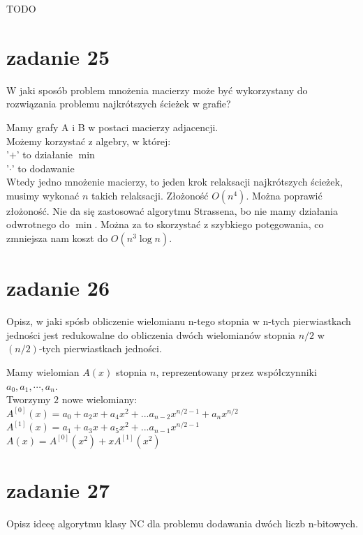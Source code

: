 \documentclass[svgnames]{report}
\begin{document}
TODO
\section{zadanie 25}
\begin{framed}
W jaki sposób problem mnożenia macierzy może być wykorzystany do rozwiązania problemu najkrótszych ścieżek w grafie?
\end{framed}

Mamy grafy A i B w postaci macierzy adjacencji.\\
Możemy korzystać z algebry, w której:\\
'$+$' to działanie $\min$\\
'$\cdot$' to dodawanie\\
Wtedy jedno mnożenie macierzy, to jeden krok relaksacji najkrótszych ścieżek, musimy wykonać $n$ takich relaksacji. Złożoność $O(n^4)$. Można poprawić złożoność. Nie da się zastosować algorytmu Strassena, bo nie mamy działania odwrotnego do $\min$. Można za to skorzystać z szybkiego potęgowania, co zmniejsza nam koszt do $O(n^3\log n)$.

\section{zadanie 26}
\begin{framed}
Opisz, w jaki spósb obliczenie wielomianu n-tego stopnia w n-tych pierwiastkach jedności jest redukowalne do obliczenia dwóch wielomianów stopnia $n/2$ w $(n/2)$-tych pierwiastkach jedności.
\end{framed}

Mamy wielomian $A(x)$ stopnia $n$, reprezentowany przez współczynniki $a_0, a_1, \cdots, a_n$.\\
Tworzymy $2$ nowe wielomiany:\\
$A^{[0]}(x)=a_0 + a_2 x + a_4 x^2 + ... a_{n-2} x^{n/2 -1} + a_n x^{n/2}$\\
$A^{[1]}(x)=a_1 + a_3 x + a_5 x^2 + ... a_{n-1} x^{n/2 -1}$\\

$A(x) = A^{[0]}(x^2)+xA^{[1]}(x^2)$\\

\section{zadanie 27}
\begin{framed}
Opisz ideeę algorytmu klasy NC dla problemu dodawania dwóch liczb n-bitowych.
\end{framed}
\end{document}
